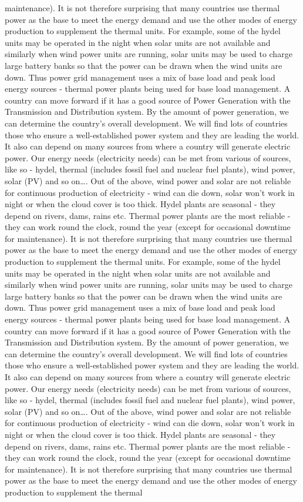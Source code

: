 \documentclass[10pt, a4paper]{article}
\begin{document}
maintenance). It is not therefore surprising that many countries use thermal power as the base to meet the energy demand and use the other modes of energy production to supplement the thermal units. For example, some of the hydel units may be operated in the night when solar units are not available and similarly when wind power units are running, solar units may be used to charge large battery banks so that the power can be drawn when the wind units are down. Thus power grid management uses a mix of base load and peak load energy sources - thermal power plants being used for base load management. A country can move forward if it has a good source of Power Generation with the Transmission and Distribution system. By the amount of power generation, we can determine the country’s overall development. We will find lots of countries those who ensure a well-established power system and they are leading the world. It also can depend on many sources from where a country will generate electric power. Our energy needs (electricity needs) can be met from various of sources, like so - hydel, thermal (includes fossil fuel and nuclear fuel plants), wind power, solar (PV) and so on\dots. Out of the above, wind power and solar are not reliable for continuous production of electricity - wind can die down, solar won’t work in night or when the cloud cover is too thick. Hydel plants are seasonal - they depend on rivers, dams, rains etc. Thermal power plants are the most reliable - they can work round the clock, round the year (except for occasional downtime for maintenance). It is not therefore surprising that many countries use thermal power as the base to meet the energy demand and use the other modes of energy production to supplement the thermal units. For example, some of the hydel units may be operated in the night when solar units are not available and similarly when wind power units are running, solar units may be used to charge large battery banks so that the power can be drawn when the wind units are down. Thus power grid management uses a mix of base load and peak load energy sources - thermal power plants being used for base load management. A country can move forward if it has a good source of Power Generation with the Transmission and Distribution system. By the amount of power generation, we can determine the country’s overall development. We will find lots of countries those who ensure a well-established power system and they are leading the world. It also can depend on many sources from where a country will generate electric power. Our energy needs (electricity needs) can be met from various of sources, like so - hydel, thermal (includes fossil fuel and nuclear fuel plants), wind power, solar (PV) and so on\dots. Out of the above, wind power and solar are not reliable for continuous production of electricity - wind can die down, solar won’t work in night or when the cloud cover is too thick. Hydel plants are seasonal - they depend on rivers, dams, rains etc. Thermal power plants are the most reliable - they can work round the clock, round the year (except for occasional downtime for maintenance). It is not therefore surprising that many countries use thermal power as the base to meet the energy demand and use the other modes of energy production to supplement the thermal 
\end{document}
